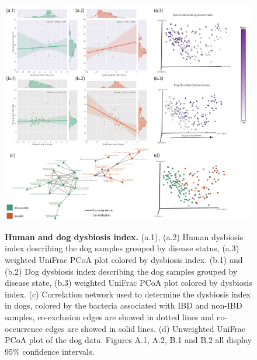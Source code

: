\begin{figure}[htbp]
\includegraphics[width=1\columnwidth]{dogs-figures/figure-2}
\label{dogs_fig2}
\caption[Human and dog dysbiosis index.]{\textbf{Human and dog dysbiosis index.} (a.1), (a.2) Human dysbiosis index describing the dog samples grouped by disease status, (a.3) weighted UniFrac PCoA plot colored by dysbiosis index. (b.1) and (b.2) Dog dysbiosis index describing the dog samples grouped by disease state, (b.3) weighted UniFrac PCoA plot colored by dysbiosis index. (c) Correlation network used to determine the dysbiosis index in dogs, colored by the bacteria associated with IBD and non-IBD samples, co-exclusion edges are showed in dotted lines and co-occurrence edges are showed in solid lines. (d) Unweighted UniFrac PCoA plot of the dog data. Figures A.1, A.2, B.1 and B.2 all display 95\% confidence intervals.}
\end{figure}

